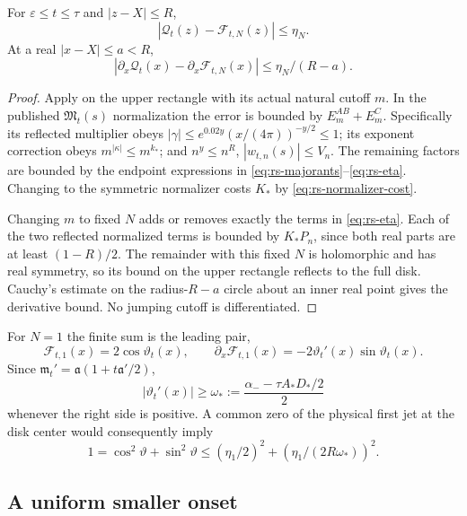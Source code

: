\begin{proposition}\label{prop:rs-disk}
For $\varepsilon\le t\le\tau$ and $|z-X|\le R$,
\[
 |\mathcal Q_t(z)-\mathcal F_{t,N}(z)|\le\eta_N.
\]
At a real $|x-X|\le a<R$,
\[
 |\partial_x\mathcal Q_t(x)-\partial_x\mathcal F_{t,N}(x)|
 \le\eta_N/(R-a).
\]
\end{proposition}
\begin{proof}
Apply \cite[Theorem 1.3, equations (23)--(24)]{Polymath}
on the upper rectangle with its actual natural cutoff $m$.
In the published $\mathfrak M_t(s)$ normalization the error is
bounded by $E_m^{AB}+E_m^C$. Specifically its reflected multiplier
obeys $|\gamma|\le e^{0.02y}(x/(4\pi))^{-y/2}\le1$;
its exponent correction obeys $m^{|\kappa|}\le m^{k_*}$;
and $n^y\le n^R$, $|w_{t,n}(s)|\le V_n$.
The remaining factors are bounded by the endpoint expressions in
\eqref{eq:rs-majorants}--\eqref{eq:rs-eta}.
Changing to the symmetric normalizer costs $K_*$ by
\eqref{eq:rs-normalizer-cost}.

Changing $m$ to fixed $N$ adds or removes exactly the terms in
\eqref{eq:rs-eta}. Each of the two reflected normalized terms
is bounded by $K_*P_n$, since both real parts are at least $(1-R)/2$.
The remainder with this fixed $N$ is holomorphic and has real symmetry,
so its bound on the upper rectangle reflects to the full disk.
Cauchy's estimate on the radius-$R-a$ circle about an inner real
point gives the derivative bound. No jumping cutoff is differentiated.
\end{proof}

For $N=1$ the finite sum is the leading pair,
\[
 \mathcal F_{t,1}(x)=2\cos\vartheta_t(x),\qquad
 \partial_x\mathcal F_{t,1}(x)
       =-2\vartheta_t'(x)\sin\vartheta_t(x).
\]
Since $\mathfrak m_t'=\mathfrak a(1+t\mathfrak a'/2)$,
\[
 |\vartheta_t'(x)|\ge
 \omega_*:=\frac{\alpha_- -\tau A_*D_*/2}{2}
\]
whenever the right side is positive. A common zero of the physical
first jet at the disk center would consequently imply
\begin{equation}\label{eq:rs-pair}
 1=\cos^2\vartheta+\sin^2\vartheta
 \le(\eta_1/2)^2+(\eta_1/(2R\omega_*))^2.
\end{equation}

\subsection{A uniform smaller onset}


